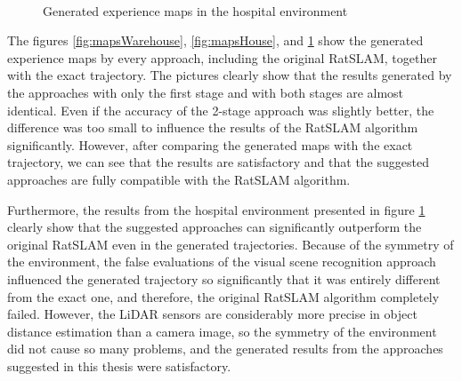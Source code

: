 \begin{figure}[!tbp]
    \centering
    \hfill
    \\
    \hfill
    \caption{Generated experience maps in the hospital environment}
    \label{fig:mapsHospital}
\end{figure}

The figures \ref{fig:mapsWarehouse}, \ref{fig:mapsHouse}, and \ref{fig:mapsHospital} show the generated experience maps by every approach, including the original RatSLAM, together with the exact trajectory. The pictures clearly show that the results generated by the approaches with only the first stage and with both stages are almost identical. Even if the accuracy of the 2-stage approach was slightly better, the difference was too small to influence the results of the RatSLAM algorithm significantly. However, after comparing the generated maps with the exact trajectory, we can see that the results are satisfactory and that the suggested approaches are fully compatible with the RatSLAM algorithm.\par
Furthermore, the results from the hospital environment presented in figure \ref{fig:mapsHospital} clearly show that the suggested approaches can significantly outperform the original RatSLAM even in the generated trajectories. Because of the symmetry of the environment, the false evaluations of the visual scene recognition approach influenced the generated trajectory so significantly that it was entirely different from the exact one, and therefore, the original RatSLAM algorithm completely failed. However, the LiDAR sensors are considerably more precise in object distance estimation than a camera image, so the symmetry of the environment did not cause so many problems, and the generated results from the approaches suggested in this thesis were satisfactory.
